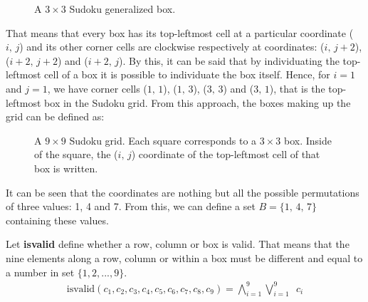 \documentclass[]{usiinfprospectus}
\newcounter{row}
\newcounter{col}
\begin{document}
\begin{enumerate}[label={(\arabic*)}]
\begin{figure}[h]
\begin{center}
\end{center}
\caption{A $3\times 3$ Sudoku generalized box.}
\end{figure}

\noindent
That means that every box has its top-leftmost cell at a particular coordinate ($i,\,j$) and its other corner cells are clockwise respectively at coordinates: ($i,\,j+2$),  ($i+2,\,j+2$) and ($i+2,\,j$). By this, it can be said that by individuating the top-leftmost cell of a box it is possible to individuate the box itself. Hence, for $i=1$ and $j=1$, we have corner cells ($1,\,1$), ($1,\,3$),  ($3,\,3$) and ($3,\,1$), that is the top-leftmost box in the Sudoku grid. From this approach, the boxes making up the grid can be defined as:
\begin{figure}[h]
\begin{center}
\end{center}
\caption{A $9\times 9$ Sudoku grid. Each square corresponds to a $3\times 3$ box. Inside of the square, the ($i,\,j$) coordinate of the top-leftmost cell of that box is written.}
\end{figure}

\noindent
It can be seen that the coordinates are nothing but all the possible permutations of three values: 1, 4 and 7. From this, we can define a set $B=\{1,\,4,\,7\}$ containing these values.\\
\end{enumerate}
\noindent
Let \textbf{isvalid} define whether a row, column or box is valid. That means that the nine elements along a row, column or within a box must be different and equal to a number in set $\{1,2,...,9\}$.
\begin{align}
\text{isvalid}\left(  c_1,  c_2,  c_3,  c_4,  c_5,  c_6,  c_7,  c_8,  c_9  \right) = \bigwedge^9_{i=1}  \bigvee^9_{i=1} \,\,\, c_i
\end{align}
\end{document}
